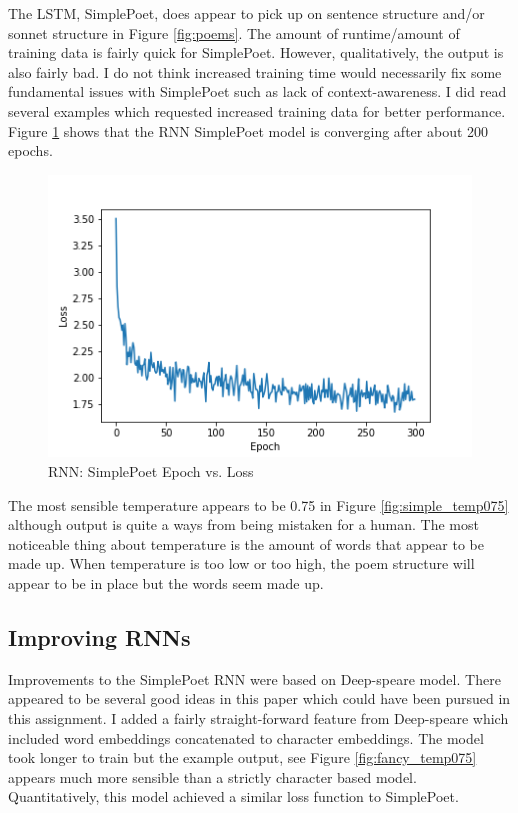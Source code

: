 \documentclass[a4paper,12pt]{article} %
\begin{document}
The LSTM, SimplePoet, does appear to pick up on sentence structure and/or
sonnet structure in Figure \ref{fig:poems}. The amount of runtime/amount of
training data is fairly quick for SimplePoet. However, qualitatively, the
output is also fairly bad. I do not think increased training time would
necessarily fix some fundamental issues with SimplePoet such as lack of
context-awareness. I did read several examples which requested increased
training data for better performance. Figure \ref{fig:simplepoet} shows
that the RNN SimplePoet model is converging after about 200 epochs. \newline

\begin{figure}[h]
  \begin{center}
    \includegraphics[scale=0.5]{simple_loss}
    \caption{RNN: SimplePoet Epoch vs. Loss}
    \label{fig:simplepoet}
    \end{center}
\end{figure}

The most sensible temperature appears to be 0.75 in Figure
\ref{fig:simple_temp075} although output is
quite a ways from being mistaken for a human. The most noticeable thing
about temperature is the amount of words that appear to be made up. When
temperature is too low or too high, the poem structure will appear to be in
place but the words seem made up.

\subsection{Improving RNNs}

Improvements to the SimplePoet RNN were based on Deep-speare
\cite{lau2018deepspeare} model. There appeared to be several good ideas
in this paper which could have been pursued in this assignment. I added
a fairly straight-forward feature from Deep-speare which included word
embeddings concatenated to character embeddings. The model took longer to
train but the example output, see Figure \ref{fig:fancy_temp075} appears
much more sensible than a strictly character based model. Quantitatively,
this model achieved a similar loss function to SimplePoet.
\end{document}
